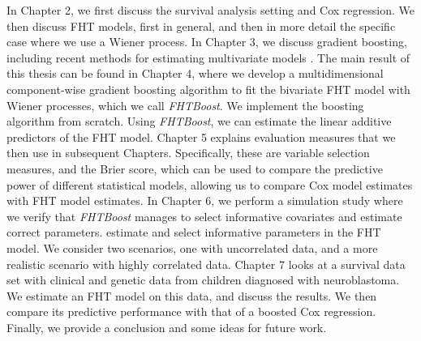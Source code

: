 In Chapter 2, we first discuss the survival analysis setting and Cox regression.
We then discuss FHT models, first in general, and then in more detail the specific case where we use a Wiener process.
In Chapter 3, we discuss gradient boosting, including recent methods for estimating multivariate models \citep{schmid, thomas2018}.
The main result of this thesis can be found in Chapter 4, where we develop a multidimensional component-wise gradient boosting algorithm to fit the bivariate FHT model with Wiener processes, which we call \textit{FHTBoost}.
We implement the boosting algorithm from scratch.
Using \textit{FHTBoost}, we can estimate the linear additive predictors of the FHT model.
Chapter 5 explains evaluation measures that we then use in subsequent Chapters.
Specifically, these are variable selection measures, and the Brier score, which can be used to compare the predictive power of different statistical models, allowing us to compare Cox model estimates with FHT model estimates.
In Chapter 6, we perform a simulation study where we verify that \textit{FHTBoost} manages to select informative covariates and estimate  correct parameters.
estimate and select informative parameters in the FHT model.
We consider two scenarios, one with uncorrelated data, and a more realistic scenario with highly correlated data.
Chapter 7 looks at a survival data set with clinical and genetic data from children diagnosed with neuroblastoma.
We estimate an FHT model on this data, and discuss the results.
We then compare its predictive performance with that of a boosted Cox regression.
Finally, we provide a conclusion and some ideas for future work.